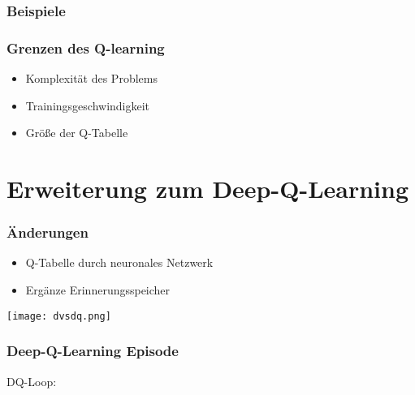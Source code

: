 \documentclass{beamer}
\begin{document}
\begin{frame}
\frametitle{Beispiele}
\end{frame}

\begin{frame}
\frametitle{Grenzen des Q-learning}
\begin{itemize}
\item Komplexität des Problems
\item Trainingsgeschwindigkeit
\item Größe der Q-Tabelle
\end{itemize}
\end{frame}


\section{Erweiterung zum Deep-Q-Learning}
\begin{frame}
\frametitle{Änderungen}
\begin{itemize}
\item Q-Tabelle durch neuronales Netzwerk
\item Ergänze Erinnerungsspeicher 
\end{itemize}
\begin{center}
\texttt{[image: dvsdq.png]}
\end{center}
\end{frame}


\begin{frame}
\frametitle{Deep-Q-Learning Episode}
\begin{center}
\end{center}
DQ-Loop:
\begin{center}
\end{center}
\end{frame}
\end{document}
